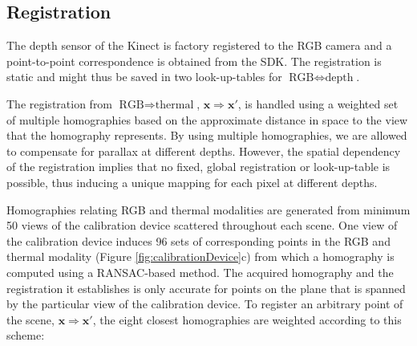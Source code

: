 \documentclass[10pt,twocolumn,letterpaper]{article}
\begin{document}
\subsection{Registration}
\label{sec:registration}
The depth sensor of the Kinect is factory registered to the RGB camera and a point-to-point correspondence is obtained from the SDK. The registration is static and might thus be saved in two look-up-tables for $\text{RGB} \Leftrightarrow \text{depth}$. %

The registration from $\text{RGB} \Rightarrow \text{thermal}$, $\mathbf{x} \Rightarrow \mathbf{x}'$, is handled using a weighted set of multiple homographies based on the approximate distance in space to the view that the homography represents. By using multiple homographies, we are allowed to compensate for parallax at different depths. However, the spatial dependency of the registration implies that no fixed, global registration or look-up-table is possible, thus inducing a unique mapping for each pixel at different depths.

Homographies relating RGB and thermal modalities are generated from minimum 50 views of the calibration device scattered throughout each scene. One view of the calibration device induces 96 sets of corresponding points in the RGB and thermal modality (Figure \ref{fig:calibrationDevice}c) from which a homography is computed using a RANSAC-based method. The acquired homography and the registration it establishes is only accurate for points on the plane that is spanned by the particular view of the calibration device. To register an arbitrary point of the scene, $\mathbf{x} \Rightarrow \mathbf{x}'$, the eight closest homographies are weighted according to this scheme:
\end{document}
